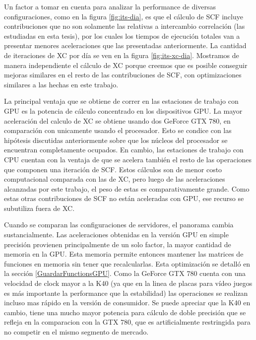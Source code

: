 Un factor a tomar en cuenta para analizar la performance de diversas configuraciones, como en la figura \ref{fig:its-dia},
es que el c\'alculo de SCF incluye contribuciones que no son solamente las relativas a intercambio correlaci\'on
(las estudiadas en esta tesis), por los cuales los tiempos de ejecuci\'on totales van
a presentar menores aceleraciones que las presentadas anteriormente. La cantidad de iteraciones de XC por d\'ia se ven
en la figura \ref{fig:its-xc-dia}. Mostramos de manera independiente el c\'alculo de XC porque
creemos que es posible conseguir mejoras similares en el resto de las contribuciones de SCF, con optimizaciones
similares a las hechas en este trabajo.

La principal ventaja que se obtiene de correr en las estaciones de trabajo con GPU es la potencia
de c\'alculo concentrado en los dispositivos GPU. La mayor aceleraci\'on del calculo de XC se obtiene
usando dos GeForce GTX 780, en comparaci\'on con unicamente usando el procesador. Esto se condice con las hip\'otesis discutidas
anteriormente sobre que los n\'ucleos del procesador se encuentran completamente ocupados.
En cambio, las estaciones de trabajo con CPU cuentan con la ventaja de que se acelera tambi\'en el
resto de las operaciones que componen una iteraci\'on de SCF. Estos c\'alculos son de menor costo computacional
comparada con las de XC, pero luego de las aceleraciones alcanzadas por este trabajo, el peso de estas
es comparativamente grande. Como estas otras contribuciones de SCF no est\'an
aceleradas con GPU, ese recurso se subutiliza fuera de XC.

Cuando se comparan las configuraciones de servidores, el panorama cambia sustancialmente.
Las aceleraciones obtenidas en la versi\'on GPU en simple precisi\'on provienen principalmente de un solo factor,
la mayor cantidad de memoria en la GPU. Esta memoria permite entonces mantener las matrices
de funciones en memoria sin tener que recalcularlas. Esta optimizaci\'on se detall\'o en la secci\'on
\ref{GuardarFunctionsGPU}. Como la GeForce GTX 780 cuenta con una velocidad de clock mayor a
la K40 (ya que en la linea de placas para v\'ideo juegos es m\'as importante
la performance que la estabilidad) las operaciones se realizan incluso mas r\'apido en la
versi\'on de consumidor. Se puede apreciar que la K40 en cambio, tiene una mucho mayor potencia
para c\'alculo de doble precisi\'on que se refleja en la comparacion con la GTX 780, que es artificialmente
restringida para no competir en el mismo segmento de mercado.

